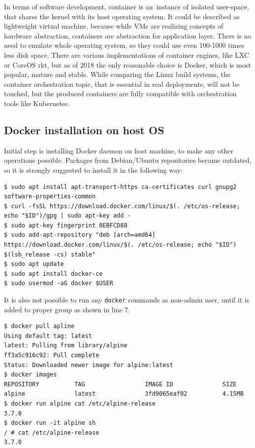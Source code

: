\documentclass[printmode]{mgr}
\begin{document}
In terms of software development, container is an~instance of isolated user-space, that shares the kernel with its host operating system.\cite{web:what-container}
It could be described as lightweight virtual machine, because while VMs are realizing concepts of hardware abstraction, containers are abstraction for application layer.
There is no need to emulate whole operating system, so they could use even 100-1000 times less disk space.
There are various implementations of container engines, like LXC or CoreOS rkt, but as of 2018 the only reasonable choice is Docker, which is most popular, mature and stable.\cite{web:why-docker}
While comparing the Linux build systems, the container orchestration topic, that is essential in real deployments\cite{web:container-orchestration}, will not be touched, but the produced containers are fully compatible with orchestration tools like Kubernetes.

\subsection*{Docker installation on host OS}

Initial step is installing Docker daemon on host machine, to make any other operations possible.
Packages from Debian/Ubuntu repositories became outdated, so it is strongly suggested to install it in the following way:

\begin{lstlisting}
$ sudo apt install apt-transport-https ca-certificates curl gnupg2 software-properties-common
$ curl -fsSL https://download.docker.com/linux/$(. /etc/os-release; echo "$ID")/gpg | sudo apt-key add -
$ sudo apt-key fingerprint 0EBFCD88
$ sudo add-apt-repository "deb [arch=amd64] https://download.docker.com/linux/$(. /etc/os-release; echo "$ID") $(lsb_release -cs) stable"
$ sudo apt update
$ sudo apt install docker-ce
$ sudo usermod -aG docker $USER
\end{lstlisting}

It is also not possible to run any \verb|docker| commands as non-admin user, until it is added to proper group as shown in line 7. \cite{web:docker-permissions}

\begin{lstlisting}
$ docker pull apline
Using default tag: latest
latest: Pulling from library/alpine
ff3a5c916c92: Pull complete 
Status: Downloaded newer image for alpine:latest
$ docker images
REPOSITORY          TAG                 IMAGE ID              SIZE
alpine              latest              3fd9065eaf02          4.15MB
$ docker run alpine cat /etc/alpine-release
3.7.0
$ docker run -it alpine sh
/ # cat /etc/alpine-release
3.7.0
\end{lstlisting}
\end{document}
